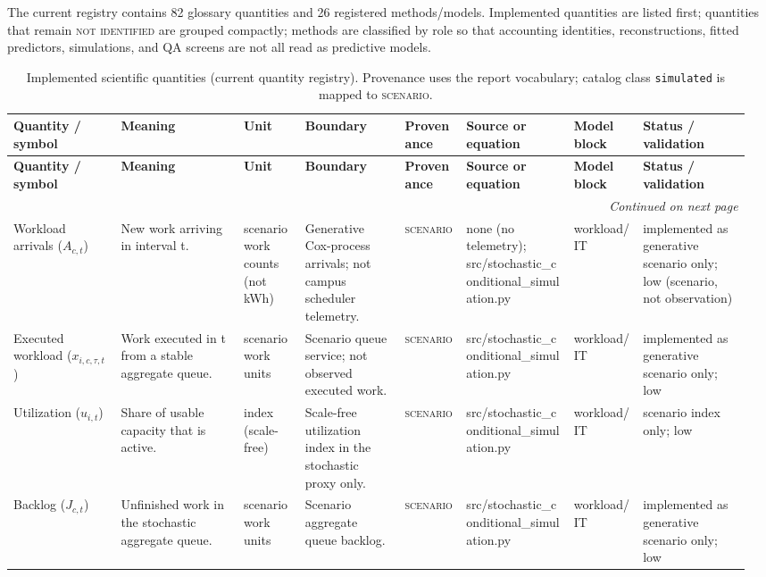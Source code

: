 \documentclass[11pt]{article}
\newcommand{\QuantityCount}{82}
\newcommand{\ModelCount}{26}
\newcommand{\Scenario}{\textsc{scenario}}
\newcommand{\NotIdentified}{\textsc{not identified}}
\begin{document}
The current registry contains \QuantityCount{} glossary quantities and \ModelCount{} registered methods/models. Implemented quantities are listed first; quantities that remain \NotIdentified{} are grouped compactly; methods are classified by role so that accounting identities, reconstructions, fitted predictors, simulations, and QA screens are not all read as predictive models.


\begingroup
\footnotesize
\setlength{\tabcolsep}{3pt}
\begin{longtable}{@{}p{0.14\linewidth}p{0.16\linewidth}p{0.08\linewidth}p{0.13\linewidth}p{0.08\linewidth}p{0.14\linewidth}p{0.09\linewidth}p{0.14\linewidth}@{}}
\caption{Implemented scientific quantities (current quantity registry). Provenance uses the report vocabulary; catalog class \texttt{simulated} is mapped to \Scenario{}.}\\
\toprule
\textbf{Quantity / symbol} & \textbf{Meaning} & \textbf{Unit} & \textbf{Boundary} & \textbf{Provenance} & \textbf{Source or equation} & \textbf{Model block} & \textbf{Status / validation} \\
\midrule
\endfirsthead
\toprule
\textbf{Quantity / symbol} & \textbf{Meaning} & \textbf{Unit} & \textbf{Boundary} & \textbf{Provenance} & \textbf{Source or equation} & \textbf{Model block} & \textbf{Status / validation} \\
\midrule
\endhead
\midrule
\multicolumn{8}{r}{\emph{Continued on next page}}\\
\endfoot
\bottomrule
\endlastfoot
Workload arrivals ($A_{c,t}$) & New work arriving in interval t. & scenario work counts (not kWh) & Generative Cox-process arrivals; not campus scheduler telemetry. & \Scenario{} & none (no telemetry); src/stochastic\_conditional\_simulation.py & workload/IT & implemented as generative scenario only; low (scenario, not observation)\\
Executed workload ($x_{i,c,\tau,t}$) & Work executed in t from a stable aggregate queue. & scenario work units & Scenario queue service; not observed executed work. & \Scenario{} & src/stochastic\_conditional\_simulation.py & workload/IT & implemented as generative scenario only; low\\
Utilization ($u_{i,t}$) & Share of usable capacity that is active. & index (scale-free) & Scale-free utilization index in the stochastic proxy only. & \Scenario{} & src/stochastic\_conditional\_simulation.py & workload/IT & scenario index only; low\\
Backlog ($J_{c,t}$) & Unfinished work in the stochastic aggregate queue. & scenario work units & Scenario aggregate queue backlog. & \Scenario{} & src/stochastic\_conditional\_simulation.py & workload/IT & implemented as generative scenario only; low\\

\end{longtable}
\end{document}
